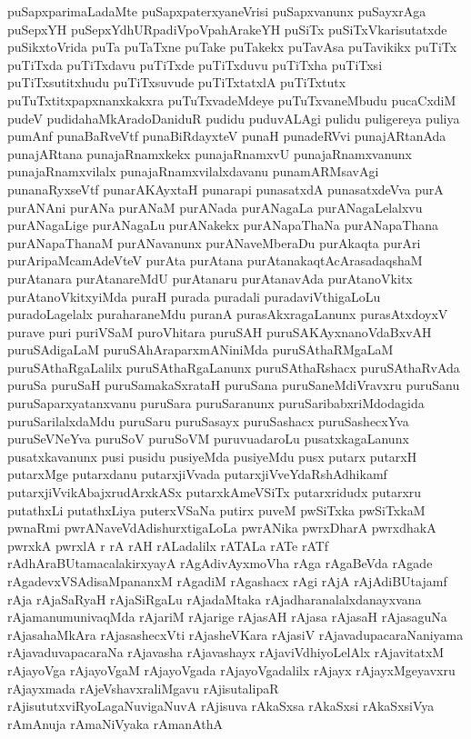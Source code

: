 {puSapxparimaLadaMte
puSapxpaterxyaneVrisi
puSapxvanunx
puSayxrAga
puSepxYH
puSepxYdhURpadiVpoVpahArakeYH
puSiTx
puSiTxVkarisutatxde
puSikxtoVrida
puTa
puTaTxne
puTake
puTakekx
puTavAsa
puTavikikx
puTiTx
puTiTxda
puTiTxdavu
puTiTxde
puTiTxduvu
puTiTxha
puTiTxsi
puTiTxsutitxhudu
puTiTxsuvude
puTiTxtatxlA
puTiTxtutx
puTuTxtitxpapxnanxkakxra
puTuTxvadeMdeye
puTuTxvaneMbudu
pucaCxdiM
pudeV
pudidahaMkAradoDaniduR
pudidu
puduvALAgi
pulidu
puligereya
puliya
pumAnf
punaBaRveVtf
punaBiRdayxteV
punaH
punadeRVvi
punajARtanAda
punajARtana
punajaRnamxkekx
punajaRnamxvU
punajaRnamxvanunx
punajaRnamxvilalx
punajaRnamxvilalxdavanu
punamARMsavAgi
punanaRyxseVtf
punarAKAyxtaH
punarapi
punasatxdA
punasatxdeVva
purA
purANAni
purANa
purANaM
purANada
purANagaLa
purANagaLelalxvu
purANagaLige
purANagaLu
purANakekx
purANapaThaNa
purANapaThana
purANapaThanaM
purANavanunx
purANaveMberaDu
purAkaqta
purAri
purAripaMcamAdeVteV
purAta
purAtana
purAtanakaqtAcArasadaqshaM
purAtanara
purAtanareMdU
purAtanaru
purAtanavAda
purAtanoVkitx
purAtanoVkitxyiMda
puraH
purada
puradali
puradaviVthigaLoLu
puradoLagelalx
puraharaneMdu
puranA
purasAkxragaLanunx
purasAtxdoyxV
purave
puri
puriVSaM
puroVhitara
puruSAH
puruSAKAyxnanoVdaBxvAH
puruSAdigaLaM
puruSAhAraparxmANiniMda
puruSAthaRMgaLaM
puruSAthaRgaLalilx
puruSAthaRgaLanunx
puruSAthaRshacx
puruSAthaRvAda
puruSa
puruSaH
puruSamakaSxrataH
puruSana
puruSaneMdiVravxru
puruSanu
puruSaparxyatanxvanu
puruSara
puruSaranunx
puruSaribabxriMdodagida
puruSarilalxdaMdu
puruSaru
puruSasayx
puruSashacx
puruSashecxYva
puruSeVNeYva
puruSoV
puruSoVM
puruvuadaroLu
pusatxkagaLanunx
pusatxkavanunx
pusi
pusidu
pusiyeMda
pusiyeMdu
pusx
putarx
putarxH
putarxMge
putarxdanu
putarxjiVvada
putarxjiVveYdaRshAdhikamf
putarxjiVvikAbajxrudArxkASx
putarxkAmeVSiTx
putarxridudx
putarxru
putathxLi
putathxLiya
puterxVSaNa
putirx
puveM
pwSiTxka
pwSiTxkaM
pwnaRmi
pwrANaveVdAdishurxtigaLoLa
pwrANika
pwrxDharA
pwrxdhakA
pwrxkA
pwrxlA
r
rA
rAH
rALadalilx
rATALa
rATe
rATf
rAdhAraBUtamacalakirxyayA
rAgAdivAyxmoVha
rAga
rAgaBeVda
rAgade
rAgadevxVSAdisaMpananxM
rAgadiM
rAgashacx
rAgi
rAjA
rAjAdiBUtajamf
rAja
rAjaSaRyaH
rAjaSiRgaLu
rAjadaMtaka
rAjadharanalalxdanayxvana
rAjamanumunivaqMda
rAjariM
rAjarige
rAjasAH
rAjasa
rAjasaH
rAjasaguNa
rAjasahaMkAra
rAjasashecxVti
rAjasheVKara
rAjasiV
rAjavadupacaraNaniyama
rAjavaduvapacaraNa
rAjavasha
rAjavashayx
rAjaviVdhiyoLelAlx
rAjavitatxM
rAjayoVga
rAjayoVgaM
rAjayoVgada
rAjayoVgadalilx
rAjayx
rAjayxMgeyavxru
rAjayxmada
rAjeVshavxraliMgavu
rAjisutalipaR
rAjisututxviRyoLagaNuvigaNuvA
rAjisuva
rAkaSxsa
rAkaSxsi
rAkaSxsiVya
rAmAnuja
rAmaNiVyaka
rAmanAthA
}
